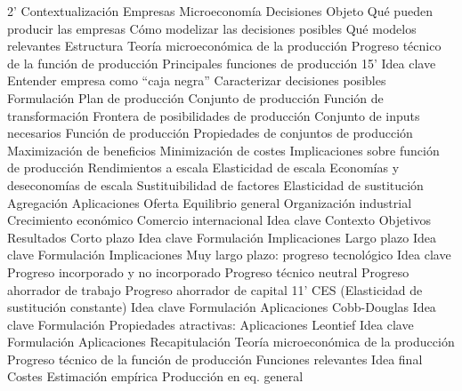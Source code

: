 \documentclass{nuevotema}
\begin{document}
\begin{esquema}[enumerate]
	\1[]  2'
		\2 Contextualización
			\3 Empresas
			\3 Microeconomía
			\3 Decisiones
		\2 Objeto
			\3 Qué pueden producir las empresas
			\3 Cómo modelizar las decisiones posibles
			\3 Qué modelos relevantes
		\2 Estructura
			\3 Teoría microeconómica de la producción
			\3 Progreso técnico de la función de producción
			\3 Principales funciones de producción
	\1  15'
		\2 Idea clave
			\3 Entender empresa como ``caja negra''
			\3 Caracterizar decisiones posibles
		\2 Formulación
			\3 Plan de producción
			\3 Conjunto de producción
			\3 {Función de transformación}
			\3 {Frontera de posibilidades de producción}
			\3 Conjunto de inputs necesarios
			\3 Función de producción
			\3 Propiedades de conjuntos de producción
			\3 Maximización de beneficios
			\3 Minimización de costes
		\2 Implicaciones sobre función de producción
			\3 Rendimientos a escala
			\3 Elasticidad de escala
			\3 Economías y deseconomías de escala
			\3 Sustituibilidad de factores
			\3 Elasticidad de sustitución
			\3 Agregación
		\2 Aplicaciones
			\3 Oferta
			\3 Equilibrio general
			\3 Organización industrial
			\3 Crecimiento económico
			\3 Comercio internacional
	\1 
		\2 Idea clave
			\3 Contexto
			\3 Objetivos
			\3 Resultados
		\2 Corto plazo
			\3 Idea clave
			\3 Formulación
			\3 Implicaciones
		\2 Largo plazo
			\3 Idea clave
			\3 Formulación
			\3 Implicaciones
		\2 Muy largo plazo: progreso tecnológico
			\3 Idea clave
			\3 Progreso incorporado y no incorporado
			\3 Progreso técnico neutral
			\3 Progreso ahorrador de trabajo
			\3 Progreso ahorrador de capital
	\1  11'
		\2 CES (Elasticidad de sustitución constante)
			\3 Idea clave
			\3 Formulación
			\3 Aplicaciones
		\2 Cobb-Douglas
			\3 Idea clave
			\3 Formulación
			\3 Propiedades atractivas:
			\3 Aplicaciones
		\2 Leontief
			\3 Idea clave
			\3 Formulación
			\3 Aplicaciones
	\1[] 
		\2 Recapitulación
			\3 Teoría microeconómica de la producción
			\3 Progreso técnico de la función de producción
			\3 Funciones relevantes
		\2 Idea final
			\3 Costes
			\3 Estimación empírica
			\3 Producción en eq. general

\end{esquema}

\esquemalargo
\end{document}
